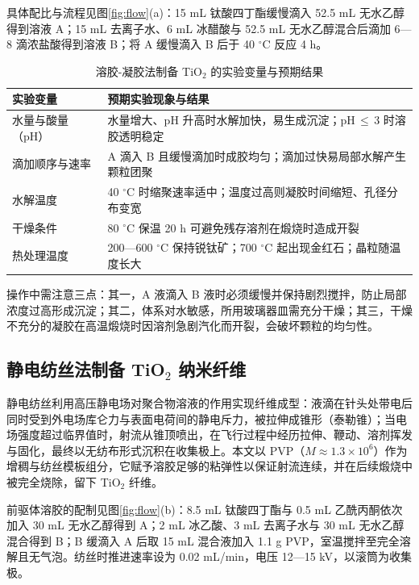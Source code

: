 具体配比与流程见图\ref{fig:flow}(a)：15 mL 钛酸四丁酯缓慢滴入 52.5 mL 无水乙醇得到溶液 A；15 mL 去离子水、6 mL 冰醋酸与 52.5 mL 无水乙醇混合后滴加 6—8 滴浓盐酸得到溶液 B；将 A 缓慢滴入 B 后于 40 $^\circ$C 反应 4 h。

\begin{table}[htbp]
  \centering
  \caption{溶胶-凝胶法制备 TiO$_2$ 的实验变量与预期结果}
  \label{tab:sg}
  \footnotesize
  \begin{tabular}{@{}p{2.4cm}p{4.1cm}@{}}
    \toprule
    实验变量 & 预期实验现象与结果 \\
    \midrule
    水量与酸量（pH） & 水量增大、pH 升高时水解加快，易生成沉淀；pH$\,\leq\,$3 时溶胶透明稳定 \\
    滴加顺序与速率 & A 滴入 B 且缓慢滴加时成胶均匀；滴加过快易局部水解产生颗粒团聚 \\
    水解温度 & 40 $^\circ$C 时缩聚速率适中；温度过高则凝胶时间缩短、孔径分布变宽 \\
    干燥条件 & 80 $^\circ$C 保温 20 h 可避免残存溶剂在煅烧时造成开裂 \\
    热处理温度 & 200—600 $^\circ$C 保持锐钛矿；700 $^\circ$C 起出现金红石；晶粒随温度长大 \\
    \bottomrule
  \end{tabular}
\end{table}

操作中需注意三点：其一，A 液滴入 B 液时必须缓慢并保持剧烈搅拌，防止局部浓度过高形成沉淀；其二，体系对水敏感，所用玻璃器皿需充分干燥；其三，干燥不充分的凝胶在高温煅烧时因溶剂急剧汽化而开裂，会破坏颗粒的均匀性。

\subsection{静电纺丝法制备 TiO$_2$ 纳米纤维}

静电纺丝利用高压静电场对聚合物溶液的作用实现纤维成型：液滴在针头处带电后同时受到外电场库仑力与表面电荷间的静电斥力，被拉伸成锥形（泰勒锥）；当电场强度超过临界值时，射流从锥顶喷出，在飞行过程中经历拉伸、鞭动、溶剂挥发与固化，最终以无纺布形式沉积在收集极上\cite{zhao2019静电纺丝}。本文以 PVP（$M\approx1.3\times10^{6}$）作为增稠与纺丝模板组分，它赋予溶胶足够的粘弹性以保证射流连续，并在后续煅烧中被完全烧除，留下 TiO$_2$ 纤维。

前驱体溶胶的配制见图\ref{fig:flow}(b)：8.5 mL 钛酸四丁酯与 0.5 mL 乙酰丙酮依次加入 30 mL 无水乙醇得到 A；2 mL 冰乙酸、3 mL 去离子水与 30 mL 无水乙醇混合得到 B；B 缓滴入 A 后取 15 mL 混合液加入 1.1 g PVP，室温搅拌至完全溶解且无气泡。纺丝时推进速率设为 0.02 mL/min，电压 12—15 kV，以滚筒为收集极。

